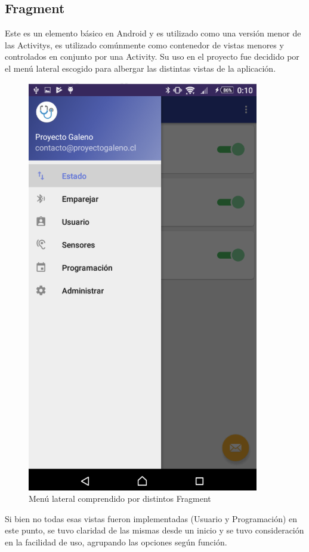 \subsection{Fragment}

Este es un elemento básico en Android y es utilizado como una versión menor de las Activitys, es utilizado comúnmente como contenedor de vistas menores y controlados en conjunto por una Activity.
Su uso en el proyecto fue decidido por el menú lateral escogido para albergar las distintas vistas de la aplicación.

\begin{figure}[H]
	\centering
	\includegraphics[scale=1]{figuras/proto1/fragment.png}
	\caption{Menú lateral comprendido por distintos Fragment}
	\label{fragment}
\end{figure}

Si bien no todas esas vistas fueron implementadas (Usuario y Programación) en este punto, se tuvo claridad de las mismas desde un inicio y se tuvo consideración en la facilidad de uso, agrupando las opciones según función.


